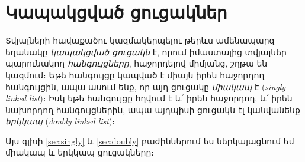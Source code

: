 %
%
%
\chapter{Կապակցված ցուցակներ}

Տվյալների հավաքածու կազմակերպելու թերևս ամենապարզ եղանակը 
\emph{կապակցված ցուցակն} է, որում իմաստալից տվյալներ
պարունակող \emph{հանգույցները}, հաջորդելով միմյանց, շղթա
են կազմում։ Եթե հանգույցը կապված է միայն իրեն հաջորդող 
հանգույցին, ապա ասում ենք, որ այդ ցուցակը \emph{միակապ} է
(\emph{singly linked list})։ Իսկ եթե հանգույցը հղվում է և՛ 
իրեն հաջորդող, և՛ իրեն նախորդող հանգույցներին, ապա այդպիսի
ցուցակն էլ կանվանենք \emph{երկկապ} (\emph{doubly linked 
list})։ 

Այս գլխի \ref{sec:singly} և \ref{sec:doubly} բաժիններում 
ես ներկայացնում եմ միակապ և երկկապ ցուցակները։






